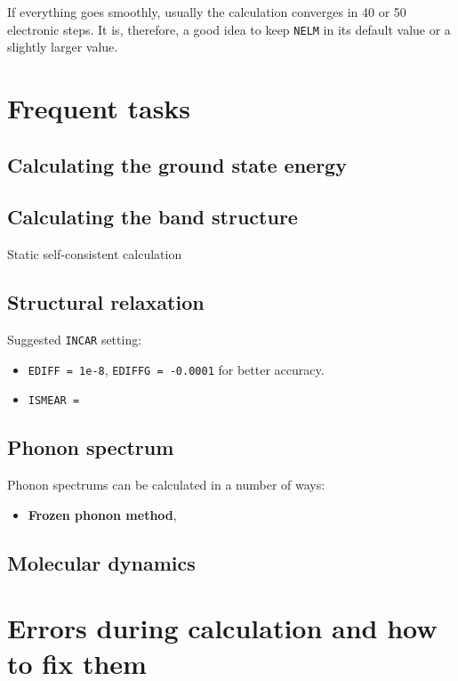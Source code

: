 \documentclass[hyperref, a4paper]{article}
\newcommand*{\concept}[1]{{\textbf{#1}}}
\begin{document}
If everything goes smoothly, usually the calculation converges in 40 or 50 electronic steps.
It is, therefore, a good idea to keep \texttt{NELM} in its default value or a slightly larger value.

\section{Frequent tasks}

\subsection{Calculating the ground state energy}

\subsection{Calculating the band structure}

Static self-consistent calculation

\subsection{Structural relaxation}

Suggested \texttt{INCAR} setting: 
\begin{itemize}
    \item \texttt{EDIFF = 1e-8}, \texttt{EDIFFG = -0.0001} for better accuracy.
    \item \texttt{ISMEAR = }
\end{itemize}

\subsection{Phonon spectrum}

Phonon spectrums can be calculated in a number of ways:
\begin{itemize}
    \item \concept{Frozen phonon method}, 
\end{itemize}

\subsection{Molecular dynamics}

\section{Errors during calculation and how to fix them}
\end{document}
